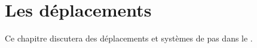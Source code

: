 \chapter{Les déplacements}\label{ch:deplacements}

Ce chapitre discutera des déplacements et systèmes de pas dans le \Taijijian{}.